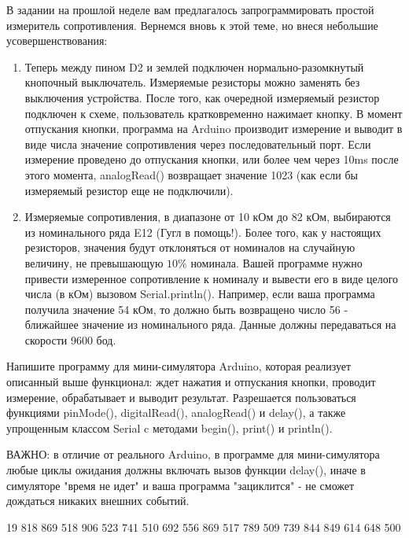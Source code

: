 
В задании на прошлой неделе вам предлагалось запрограммировать простой измеритель сопротивления.  
Вернемся вновь к этой теме, но внеся небольшие усовершенствования:  


\begin{enumerate}
    \item Теперь между пином D2 и землей подключен нормально-разомкнутый кнопочный выключатель. Измеряемые резисторы можно заменять без выключения устройства.  После того, как очередной измеряемый резистор подключен к схеме, пользователь кратковременно нажимает кнопку. В момент отпускания кнопки, программа на Arduino производит измерение и выводит в виде числа значение сопротивления через последовательный порт. Если измерение проведено до отпускания кнопки, или более чем через 10ms после этого момента,  analogRead() возвращает значение 1023 (как если бы измеряемый резистор еще не подключили).  
    \item Измеряемые сопротивления, в диапазоне от 10 кОм до 82 кОм, выбираются из номинального ряда E12 (Гугл в помощь!). Более того, как у настоящих резисторов, значения будут отклоняться от номиналов на случайную величину, не превышающую $10\%$ номинала. Вашей программе нужно привести измеренное сопротивление к номиналу и вывести его в виде целого числа (в кОм) вызовом Serial.println(). Например, если ваша программа получила значение 54 кОм, то должно быть возвращено число 56 - ближайшее значение из номинального ряда. Данные должны передаваться на скорости 9600 бод.
\end{enumerate}

Напишите программу для мини-симулятора Arduino, которая реализует описанный выше функционал:  ждет нажатия и отпускания кнопки, проводит измерение, обрабатывает и выводит результат.  Разрешается пользоваться функциями pinMode(),  digitalRead(), analogRead() и delay(),  а также упрощенным классом Serial c методами begin(), print() и println().  

ВАЖНО: в отличие от реального Arduino, в программе для мини-симулятора любые циклы ожидания должны включать вызов функции delay(),  иначе в симуляторе "время не идет" и ваша программа  "зациклится" - не сможет дождаться никаких внешних событий.

\begin{myverbbox}[\small]{\vinput}
    19
    818
    869
    518
    906
    523
    741
    510
    692
    556
    869
    517
    789
    509
    739
    844
    849
    614
    648
    500
\end{myverbbox}

